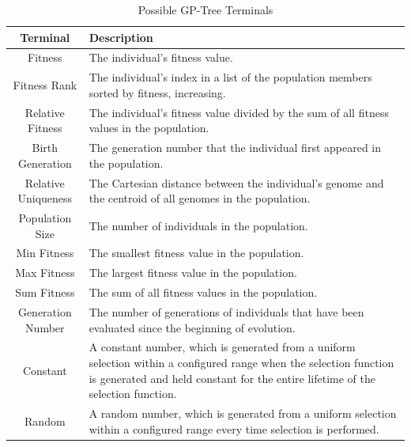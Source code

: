 \documentclass[times,12pt,titlepage]{mstogs}
\begin{document}
\begin{ThesisBody}
\begin{table}
\begin{tabular}{cc|p{9cm}}
    \bottomrule
\end{tabular}
\end{table}

\begin{table}
\centering
  \caption{Possible GP-Tree Terminals}
  \label{tab:gp-terminals}
  \begin{tabular}{c|p{9cm}}
    \toprule
    Terminal & Description\\
    \midrule
    Fitness &  The individual's fitness value. \\
    \hline
    Fitness Rank &  The individual's index in a list of the population members sorted by fitness, increasing. \\    
    \hline
    Relative Fitness &  The individual's fitness value divided by the sum of all fitness values in the population. \\
    \hline
    Birth Generation &  The generation number that the individual first appeared in the population. \\    
    \hline
    Relative Uniqueness &  The Cartesian distance between the individual's genome and the centroid of all genomes in the population. \\
    \hline
    Population Size &  The number of individuals in the population. \\
    \hline
    Min Fitness &  The smallest fitness value in the population. \\
    \hline
    Max Fitness &  The largest fitness value in the population. \\ 
    \hline
    Sum Fitness &  The sum of all fitness values in the population. \\
    \hline
    Generation Number &  The number of generations of individuals that have been evaluated since the beginning of evolution. \\
    \hline
    Constant &  A constant number, which is generated from a uniform selection within a configured range when the selection function is generated and held constant for the entire lifetime of the selection function. \\
    \hline
    Random &  A random number, which is generated from a uniform selection within a configured range every time selection is performed. \\                
        

    \bottomrule
\end{tabular}
\end{table}


\end{ThesisBody}
\end{document}
